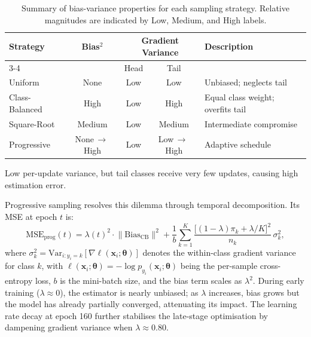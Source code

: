 \documentclass[12pt,a4paper]{article}
\newcommand{\bx}{\mathbf{x}}
\newcommand{\btheta}{\boldsymbol{\theta}}
\begin{document}
\begin{table}[H]
    \centering
    \caption{Summary of bias-variance properties for each sampling strategy. Relative magnitudes are indicated by Low, Medium, and High labels.}
    \label{tab:bias_variance_summary}
    \begin{threeparttable}
    \begin{tabular}{lcccl}
        \toprule
        \textbf{Strategy} & \textbf{Bias}$^2$ & \multicolumn{2}{c}{\textbf{Gradient Variance}} & \textbf{Description} \\
        \cmidrule(lr){3-4}
         & & Head & Tail & \\
        \midrule
        Uniform        & None   & Low  & Low\tnote{a}  & Unbiased; neglects tail \\
        Class-Balanced & High   & Low  & High           & Equal class weight; overfits tail \\
        Square-Root    & Medium & Low  & Medium         & Intermediate compromise \\
        Progressive    & None\,$\to$\,High & Low & Low\,$\to$\,High & Adaptive schedule \\
        \bottomrule
    \end{tabular}
    \begin{tablenotes}[flushleft]
        \footnotesize
        \item[a] Low per-update variance, but tail classes receive very few updates, causing high estimation error.
    \end{tablenotes}
    \end{threeparttable}
\end{table}

Progressive sampling resolves this dilemma through temporal decomposition. Its MSE at epoch $t$ is:
\begin{equation}
    \mathrm{MSE}_{\text{prog}}(t) = \lambda(t)^2 \cdot \lVert \mathrm{Bias}_{\text{CB}} \rVert^2 + \frac{1}{b}\sum_{k=1}^{K} \frac{\bigl[(1-\lambda)\pi_k + \lambda/K\bigr]^2}{n_k}\,\sigma_k^2,
    \label{eq:mse_progressive}
\end{equation}
where $\sigma_k^2 = \mathrm{Var}_{i:y_i=k}[\nabla \ell(\bx_i; \btheta)]$ denotes the within-class gradient variance for class $k$, with $\ell(\bx_i; \btheta) = -\log p_{y_i}(\bx_i; \btheta)$ being the per-sample cross-entropy loss, $b$ is the mini-batch size, and the bias term scales as $\lambda^2$. During early training ($\lambda \approx 0$), the estimator is nearly unbiased; as $\lambda$ increases, bias grows but the model has already partially converged, attenuating its impact. The learning rate decay at epoch 160 further stabilises the late-stage optimisation by dampening gradient variance when $\lambda \approx 0.80$.
\end{document}
